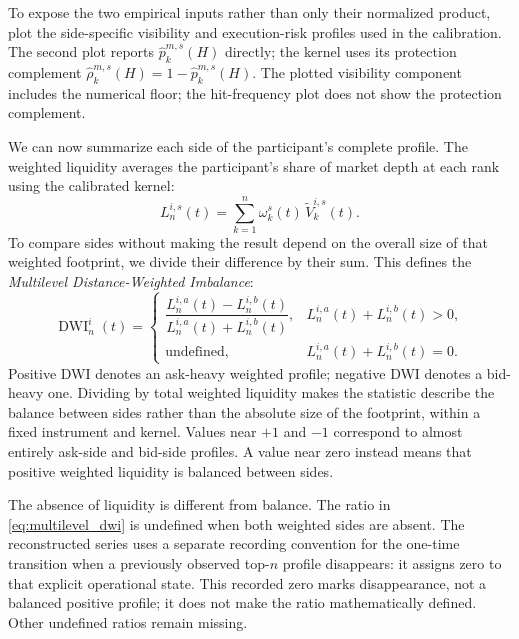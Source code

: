\documentclass[11pt]{article}
\begin{document}
To expose the two empirical inputs rather than only their normalized product,
 plot the side-specific
visibility and execution-risk profiles used in the calibration. The second plot reports
$\widehat p^{m,s}_{k}(H)$ directly; the
kernel uses its protection complement $\widehat\rho^{m,s}_{k}(H)=1-\widehat p^{m,s}_{k}(H)$. The plotted visibility component includes the numerical floor; the hit-frequency plot does not show the protection complement.


\FloatBarrier

We can now summarize each side of the participant's complete profile. The weighted liquidity averages the participant's share of market depth at each rank using the calibrated kernel:
\begin{equation}
    L^{i,s}_{n}(t)
    =
    \sum_{k=1}^{n}
    \omega^{s}_{k}(t)\,\widetilde V^{i,s}_{k}(t).
    \label{eq:weighted_topn_liquidity}
\end{equation}
To compare sides without making the result depend on the overall size of that weighted footprint, we divide their difference by their sum. This defines the \textit{Multilevel Distance-Weighted Imbalance}:
\begin{equation}
    \operatorname{DWI}^{i}_{n}(t)
    =\begin{cases}
    \dfrac{
        L^{i,a}_{n}(t)-L^{i,b}_{n}(t)
    }{
        L^{i,a}_{n}(t)+L^{i,b}_{n}(t)
    },
    & L^{i,a}_{n}(t)+L^{i,b}_{n}(t)>0,\\
    \text{undefined},
    & L^{i,a}_{n}(t)+L^{i,b}_{n}(t)=0.
    \end{cases}
    \label{eq:multilevel_dwi}
\end{equation}
Positive DWI denotes an ask-heavy weighted profile; negative DWI denotes a bid-heavy one. Dividing by total weighted liquidity makes the statistic describe the balance between sides rather than the absolute size of the footprint, within a fixed instrument and kernel. Values near $+1$ and $-1$ correspond to almost entirely ask-side and bid-side profiles. A value near zero instead means that positive weighted liquidity is balanced between sides.

The absence of liquidity is different from balance. The ratio in \cref{eq:multilevel_dwi} is undefined when both weighted sides are absent. The reconstructed series uses a separate recording convention for the one-time transition when a previously observed top-$n$ profile disappears: it assigns zero to that explicit operational state. This recorded zero marks disappearance, not a balanced positive profile; it does not make the ratio mathematically defined. Other undefined ratios remain missing.
\end{document}
